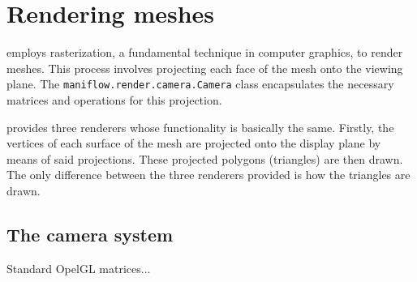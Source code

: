 \section{Rendering meshes}
\maniflow{} employs rasterization, a fundamental technique in computer graphics, to render meshes. This process involves projecting each face of the mesh onto the viewing plane. The \texttt{maniflow.render.camera.Camera} class encapsulates the necessary matrices and operations for this projection.

\maniflow{} provides three renderers whose functionality is basically the same. Firstly, the vertices of each surface of the mesh are projected onto the display plane by means of said projections. These projected polygons (triangles) are then drawn. The only difference between the three renderers provided is how the triangles are drawn.

\subsection{The camera system}
Standard OpelGL matrices... \cite{Teschner}
